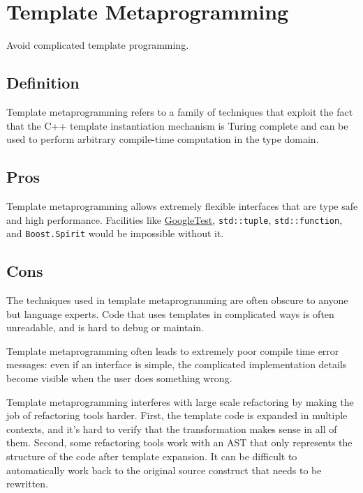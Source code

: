 
\section{Template Metaprogramming}\label{sec:template-metaprogramming}
Avoid complicated template programming.

\subsection{Definition}
Template metaprogramming refers to a family of techniques that exploit the fact that the C++ template instantiation mechanism is Turing complete and can be used to perform arbitrary compile-time computation in the type domain.

\subsection{Pros}
Template metaprogramming allows extremely flexible interfaces that are type safe and high performance. Facilities like \href{https://github.com/google/googletest}{GoogleTest}, \texttt{std::tuple}, \texttt{std::function}, and \texttt{Boost.Spirit} would be impossible without it.

\subsection{Cons}
The techniques used in template metaprogramming are often obscure to anyone but language experts. Code that uses templates in complicated ways is often unreadable, and is hard to debug or maintain.

Template metaprogramming often leads to extremely poor compile time error messages: even if an interface is simple, the complicated implementation details become visible when the user does something wrong.

Template metaprogramming interferes with large scale refactoring by making the job of refactoring tools harder. First, the template code is expanded in multiple contexts, and it's hard to verify that the transformation makes sense in all of them. Second, some refactoring tools work with an AST that only represents the structure of the code after template expansion. It can be difficult to automatically work back to the original source construct that needs to be rewritten.



